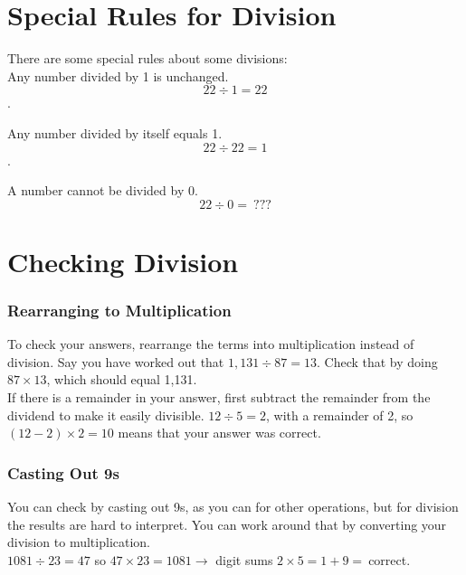 \documentclass{article}
\begin{document}
\section{Special Rules for Division}

There are some special rules about some divisions:\\

Any number divided by 1 is unchanged.\\

$$22 \div 1 = 22$$.

Any number divided by itself equals 1.\\

$$22 \div 22 = 1$$.

A number cannot be divided by 0.\\

$$22 \div 0 = \ ???$$

\pagebreak

\section{Checking Division}

\subsubsection*{Rearranging to Multiplication}

To check your answers, rearrange the terms into multiplication instead of division. Say you have worked out that $1,131 \div 87 = 13$. Check that by doing $87 \times 13$, which should equal 1,131.\\

If there is a  remainder in your answer, first subtract the remainder from the dividend to make it easily divisible. $12 \div 5 = 2$, with a remainder of 2, so $(12 - 2) \times 2 = 10$ means that your answer was correct.\\

\subsubsection*{Casting Out 9s}

You can check by casting out 9s, as you can for other operations, but for division the results are hard to interpret. You can work around that by converting your division to multiplication.\\

$1081 \div 23 = 47$ so $47 \times 23 = 1081 \rightarrow$ digit sums $2 \times 5 = 1 + 9 = \ $correct.\\
\end{document}
